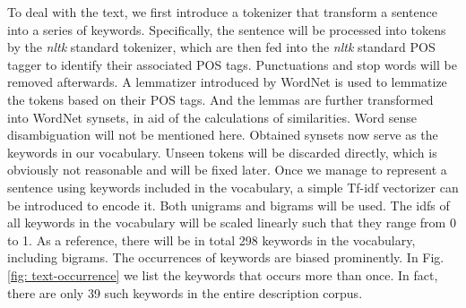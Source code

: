 \documentclass{article} %
\begin{document}
To deal with the text, we first introduce a tokenizer that transform a sentence into a series of keywords. Specifically, the sentence will be processed into tokens by the \emph{nltk} standard tokenizer, which are then fed into the \emph{nltk} standard POS tagger to identify their associated POS tags. Punctuations and stop words will be removed afterwards. A lemmatizer introduced by WordNet is used to lemmatize the tokens based on their POS tags. And the lemmas are further transformed into WordNet synsets, in aid of the calculations of similarities. Word sense disambiguation will not be mentioned here. Obtained synsets now serve as the keywords in our vocabulary. Unseen tokens will be discarded directly, which is obviously not reasonable and will be fixed later. Once we manage to represent a sentence using keywords included in the vocabulary, a simple Tf-idf vectorizer can be introduced to encode it. Both unigrams and bigrams will be used. The idfs of all keywords in the vocabulary will be scaled linearly such that they range from 0 to 1. As a reference, there will be in total 298 keywords in the vocabulary, including bigrams. The occurrences of keywords are biased prominently. In Fig. \ref{fig: text-occurrence} we list the keywords that occurs more than once. In fact, there are only 39 such keywords in the entire description corpus. 
\end{document}
